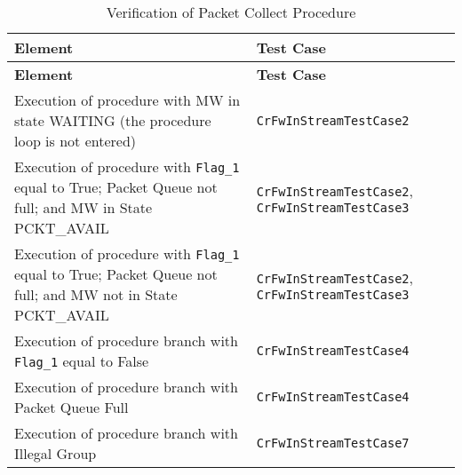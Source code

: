 \documentclass{pnp_article}
\begin{document}
\begin{longtable}{|>{\raggedright}p{8.0cm}|P{5.0cm}|}
\caption{Verification of Packet Collect Procedure}
\label{tab:verPcktCollectProc}\\
\hline
{}
\textbf{Element} & \textbf{Test Case} \\
\hline
\endfirsthead
{}
\textbf{Element} & \textbf{Test Case} \\
\hline
\endhead
Execution of procedure with MW in state WAITING (the procedure loop is not entered) & \texttt{CrFwInStreamTestCase2} \\
\hline
Execution of procedure with \texttt{Flag\_1} equal to True; Packet Queue not full; and MW in State PCKT\_AVAIL & \texttt{CrFwInStreamTestCase2}, \texttt{CrFwInStreamTestCase3}\\
\hline
Execution of procedure with \texttt{Flag\_1} equal to True; Packet Queue not full; and MW not in State PCKT\_AVAIL & \texttt{CrFwInStreamTestCase2}, \texttt{CrFwInStreamTestCase3}\\
\hline
Execution of procedure branch with \texttt{Flag\_1} equal to False & \texttt{CrFwInStreamTestCase4}\\
\hline
Execution of procedure branch with Packet Queue Full & \texttt{CrFwInStreamTestCase4}\\
\hline
Execution of procedure branch with Illegal Group & \texttt{CrFwInStreamTestCase7}\\
\hline
\end{longtable}
\end{document}
